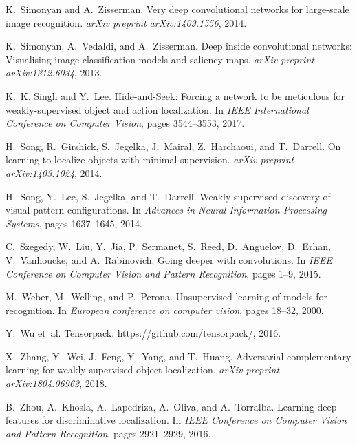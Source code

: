\documentclass{bmvc2k}
\begin{document}
\begin{thebibliography}{33}
K.~Simonyan and A.~Zisserman.
\newblock Very deep convolutional networks for large-scale image recognition.
\newblock \emph{arXiv preprint arXiv:1409.1556}, 2014.

K.~Simonyan, A.~Vedaldi, and A.~Zisserman.
\newblock Deep inside convolutional networks: Visualising image classification
  models and saliency maps.
\newblock \emph{arXiv preprint arXiv:1312.6034}, 2013.

K.~K. Singh and Y.~Lee.
\newblock Hide-and-{S}eek: Forcing a network to be meticulous for
  weakly-supervised object and action localization.
\newblock In \emph{IEEE International Conference on Computer Vision}, pages
  3544--3553, 2017.

H.~Song, R.~Girshick, S.~Jegelka, J.~Mairal, Z.~Harchaoui, and T.~Darrell.
\newblock On learning to localize objects with minimal supervision.
\newblock \emph{arXiv preprint arXiv:1403.1024}, 2014{}.

H.~Song, Y.~Lee, S.~Jegelka, and T.~Darrell.
\newblock Weakly-supervised discovery of visual pattern configurations.
\newblock In \emph{Advances in Neural Information Processing Systems}, pages
  1637--1645, 2014{}.

C.~Szegedy, W.~Liu, Y.~Jia, P.~Sermanet, S.~Reed, D.~Anguelov, D.~Erhan,
  V.~Vanhoucke, and A.~Rabinovich.
\newblock Going deeper with convolutions.
\newblock In \emph{IEEE Conference on Computer Vision and Pattern Recognition},
  pages 1--9, 2015.

M.~Weber, M.~Welling, and P.~Perona.
\newblock Unsupervised learning of models for recognition.
\newblock In \emph{European conference on computer vision}, pages 18--32, 2000.

Y.~Wu et~al.
\newblock Tensorpack.
\newblock \url{https://github.com/tensorpack/}, 2016.

X.~Zhang, Y.~Wei, J.~Feng, Y.~Yang, and T.~Huang.
\newblock Adversarial complementary learning for weakly supervised object
  localization.
\newblock \emph{arXiv preprint arXiv:1804.06962}, 2018.

B.~Zhou, A.~Khosla, A.~Lapedriza, A.~Oliva, and A.~Torralba.
\newblock Learning deep features for discriminative localization.
\newblock In \emph{IEEE Conference on Computer Vision and Pattern Recognition},
  pages 2921--2929, 2016.

\end{thebibliography}
\end{document}
